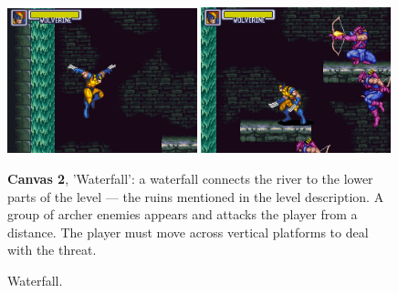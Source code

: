 \documentclass[english]{textolivre}
\begin{document}
\begin{figure}[htbp]
\begin{minipage}[t]{.47\textwidth}
\vspace{0pt}
\includegraphics[width=0.49\textwidth]{fig-006.png}
\hfill
\includegraphics[width=0.49\textwidth]{fig-007.png}
\caption{Waterfall.}
\label{fig-006e007}
\end{minipage}
\hfill
\begin{minipage}[t]{.47\textwidth}
\vspace{2pt}
\textbf{Canvas 2}, 'Waterfall': a waterfall connects the river to the lower parts of the level — the ruins mentioned in the level description. A group of archer enemies appears and attacks the player from a distance. The player must move across vertical platforms to deal with the threat.
\end{minipage}
\end{figure}
\end{document}
